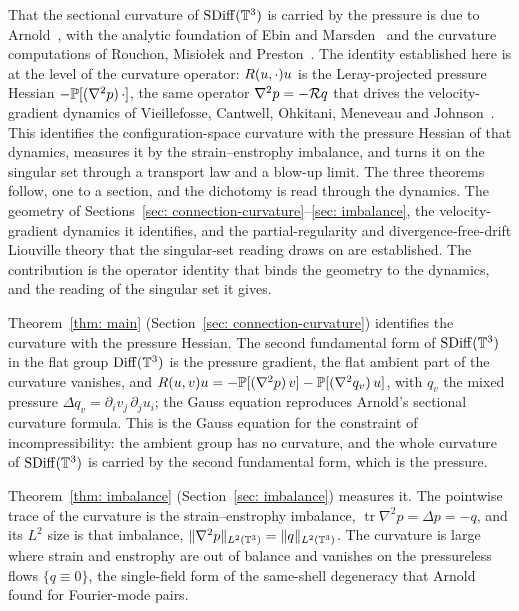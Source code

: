 That the sectional curvature of $\operatorname{SDiff}(\mathbb{T}^3)$ is carried by the pressure is due to
Arnold~\cite{arnold-1966-sur-la-geo, arnold-1998-top-met-hyd}, with the analytic
foundation of Ebin and Marsden~\cite{ebin-1970-gro-dif-mot} and the curvature
computations of Rouchon, Misio\l{}ek and Preston~\cite{rouchon-1992-jac-cur,
misiolek-1993-sta-flo-ide, preston-2004-ide-flu-ins}. The identity established
here is at the level of the curvature operator: $R(u,\cdot)u$ is the
Leray-projected pressure Hessian $-\mathbb{P}[(\nabla^2 p)\,\cdot]$, the same operator
$\nabla^2 p = -\mathcal{R} q$ that drives the velocity-gradient dynamics of
Vieillefosse, Cantwell, Ohkitani, Meneveau and Johnson~\cite{vieillefosse-1982-loc-int,
cantwell-1992-exa-sol, ohkitani-1995-non-nat, meneveau-2011-lag-dyn-mod,
johnson-2021-rol-vor-str}. This identifies the configuration-space curvature with
the pressure Hessian of that dynamics, measures it by the strain--enstrophy
imbalance, and turns it on the singular set through a transport law and a blow-up
limit. The three theorems follow, one to a section, and the dichotomy is read
through the dynamics. The geometry of Sections~\ref{sec: connection-curvature}--\ref{sec: imbalance},
the velocity-gradient dynamics it identifies, and the partial-regularity and
divergence-free-drift Liouville theory that the singular-set reading draws on are
established. The contribution is the operator identity that binds the geometry to
the dynamics, and the reading of the singular set it gives.

Theorem~\ref{thm: main} (Section~\ref{sec: connection-curvature}) identifies the
curvature with the pressure Hessian. The second fundamental form of
$\operatorname{SDiff}(\mathbb{T}^3)$ in the flat group $\operatorname{Diff}(\mathbb{T}^3)$ is the pressure gradient, the
flat ambient part of the curvature vanishes, and
$R(u,v)u = -\mathbb{P}[(\nabla^2 p)\,v] - \mathbb{P}[(\nabla^2 q_v)\,u]$, with $q_v$
the mixed pressure $\Delta q_v = \partial_i v_j\,\partial_j u_i$; the Gauss
equation reproduces Arnold's sectional curvature formula. This is the Gauss
equation for the constraint of incompressibility: the ambient group has no
curvature, and the whole curvature of $\operatorname{SDiff}(\mathbb{T}^3)$ is carried by the second
fundamental form, which is the pressure.

Theorem~\ref{thm: imbalance} (Section~\ref{sec: imbalance}) measures it. The
pointwise trace of the curvature is the strain--enstrophy imbalance,
$\operatorname{tr}\nabla^2 p = \Delta p = -q$, and its $L^2$ size is that
imbalance, $\lVert \nabla^2 p \rVert_{L^2(\mathbb{T}^3)} = \lVert q \rVert_{L^2(\mathbb{T}^3)}$. The curvature
is large where strain and enstrophy are out of balance and vanishes on the
pressureless flows $\{q \equiv 0\}$, the single-field form of the same-shell
degeneracy that Arnold found for Fourier-mode pairs.

